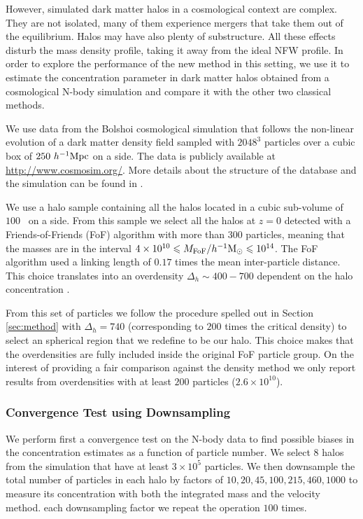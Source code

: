\documentclass[a4,useAMS,usenatbib,usegraphicx]{mn2e}
\newcommand{\hMpc}{{\ifmmode{h^{-1}{\rm Mpc}}\else{$h^{-1}$Mpc}\fi}}
\newcommand{\hMsun}{{\ifmmode{h^{-1}{\rm {M_{\odot}}}}\else{$h^{-1}{\rm{M_{\odot}}}$}\fi}}
\begin{document}
However, simulated dark matter halos in a cosmological context are
complex. 
They are not isolated, many of them  experience mergers that take them
out of the equilibrium. 
Halos may have also plenty of substructure. 
All these effects disturb the mass density profile, taking it  away
from the ideal NFW profile. 
In order to explore the performance of the new method in this setting, we
use it to estimate the  concentration parameter in dark matter halos
obtained from a cosmological N-body simulation and compare it with the
other two classical methods.   
 
We use data from the Bolshoi cosmological simulation that follows
the non-linear evolution of a dark matter density field sampled with
$2048^3$ particles over a cubic box of $250\ \hMpc$ on a side.  
The data is publicly available at \url{http://www.cosmosim.org/}.
More details about the structure of the database and the simulation
can be found in \citep{2013AN....334..691R}.

We use a halo sample containing all the halos located in a cubic
sub-volume of $100$ \hMpc\ on a side.
From this sample we select all the halos at $z=0$ detected
with a Friends-of-Friends (FoF) algorithm with more than 300
particles, meaning that the masses are in the interval
$4\times 10^{10}\leq M_{\rm FoF}/\hMsun \leq 10^{14}$.  
The FoF algorithm used a linking length of $0.17$ times the mean
inter-particle distance. This choice translates into an overdensity
$\Delta_h\sim  400-700$ dependent on the halo concentration \citep{More2011}.

From this set of particles we follow the procedure spelled out in
Section \ref{sec:method} with $\Delta_h=740$ (corresponding to $200$
times the critical density) to select an spherical region that we
redefine to be our halo.  
This choice makes that the overdensities are fully included inside the
original FoF particle group.   
On the interest of providing a fair comparison against the density method we
only report results from overdensities with at least $200$ particles
($2.6\times 10^{10}$\hMsun). 

\subsubsection{Convergence Test using Downsampling}

We perform first a convergence test on the N-body data to find
possible biases in the concentration estimates as a function of
particle number. 
We select $8$ halos from the simulation that have at least $3\times
10^5$ particles. 
We then downsample the total number of particles in each halo by
factors of $10, 20, 45, 100, 215, 460, 1000$ to measure its
concentration with both the integrated mass and the velocity method.
each downsampling factor we repeat the operation $100$ times.   
\end{document}
